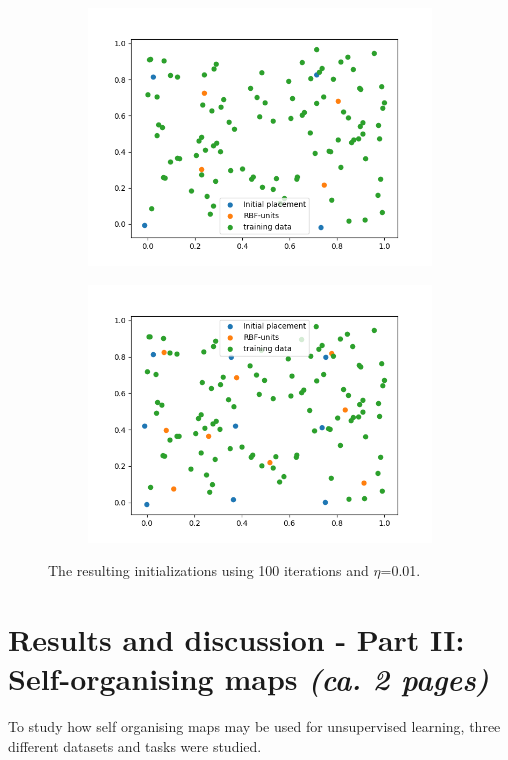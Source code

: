\documentclass[a4paper]{article}
\begin{document}
\begin{figure}[ht]
   \begin{subfigure}[b]{0.5\textwidth}
   \centering
   \includegraphics[width=\linewidth]{figures/RBF_cl_2.png}
   \end{subfigure}
  \begin{subfigure}[b]{0.5\textwidth}
   \centering
   \includegraphics[width=\linewidth]{figures/RBF_cl.png}
   \end{subfigure}
   \caption{The resulting initializations using 100 iterations and $\eta$=0.01.}
   \label{fig:cl_init}
\end{figure}

\section{Results and discussion - Part II: Self-organising maps \normalsize{\textit{(ca. 2 pages)}}}
To study how self organising maps may be used for unsupervised learning, three different datasets and tasks were studied.
\end{document}
